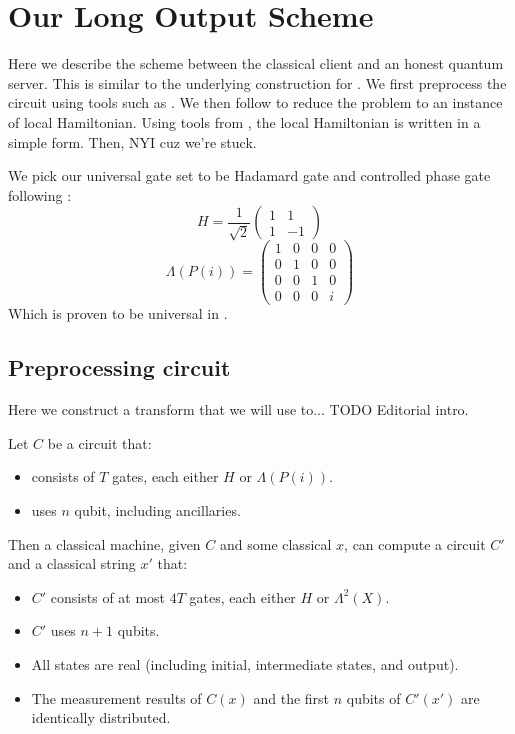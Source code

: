\section{Our Long Output Scheme}

Here we describe the scheme between the classical client and an honest quantum server. This is similar to the underlying construction for \cite{mahadev_delegation}. We first preprocess the circuit using tools such as \cite{quant-ph/0301040}. We then follow \cite{kitaev2002classical} to reduce the problem to an instance of local Hamiltonian. Using tools from \cite{PhysRevA.93.022326}, the local Hamiltonian is written in a simple form. Then, NYI cuz we're stuck.

We pick our universal gate set to be Hadamard gate and controlled phase gate following \cite{quant-ph/0301040}:
$$H=\frac{1}{\sqrt{2}}\begin{pmatrix}1&1\\1&-1\end{pmatrix}$$
$$\Lambda(P(i))=\begin{pmatrix}1&0&0&0\\0&1&0&0\\0&0&1&0\\0&0&0&i\end{pmatrix}$$
Which is proven to be universal in \cite{kitaev_1997}.

\subsection{Preprocessing circuit}

Here we construct a transform that we will use to... TODO Editorial intro.

\begin{theorem}
	Let $C$ be a circuit that:
	\begin{itemize}
		\item consists of $T$ gates, each either $H$ or $\Lambda(P(i))$.
		\item uses $n$ qubit, including ancillaries.
	\end{itemize}
	Then a classical machine, given $C$ and some classical $x$, can compute a circuit $C'$ and a classical string $x'$ that:
	\begin{itemize}
		\item $C'$ consists of at most $4T$ gates, each either $H$ or $\Lambda^2(X)$.
		\item $C'$ uses $n+1$ qubits.
		\item All states are real (including initial, intermediate states, and output).
		\item The measurement results of $C(x)$ and the first $n$ qubits of $C'(x')$ are identically distributed.
	\end{itemize}
\end{theorem}

